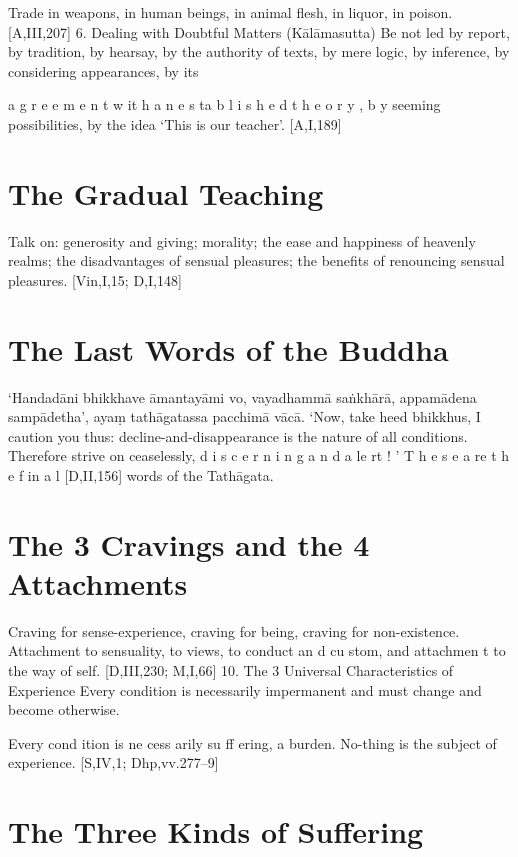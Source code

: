 Trade in weapons, in human beings, in animal
flesh, in liquor, in poison.
[A,III,207]
6. Dealing with Doubtful Matters (Kālāmasutta)
Be not led by report, by tradition, by hearsay,
by the authority of texts, by mere logic, by
inference, by considering appearances, by its

a g r e e m e n t w it h a n e s ta b l i s h e d t h e o r y , b y
seeming possibilities, by the idea ‘This is our
teacher’.
[A,I,189]

\section{The Gradual Teaching}

Talk on: generosity and giving; morality; the
ease and happiness of heavenly realms; the disadvantages of sensual pleasures; the benefits of
renouncing sensual pleasures.
[Vin,I,15; D,I,148]

\section{The Last Words of the Buddha}

‘Handadāni bhikkhave āmantayāmi vo,
vayadhammā saṅkhārā,
appamādena sampādetha’,
ayaṃ tathāgatassa pacchimā vācā.
‘Now, take heed bhikkhus, I caution you thus:
decline-and-disappearance is the nature of all
conditions. Therefore strive on ceaselessly,
d i s c e r n i n g a n d a le rt ! ’ T h e s e a re t h e f in a l
[D,II,156]
words of the Tathāgata.

\section{The 3 Cravings and the 4 Attachments}

Craving for sense-experience, craving for
being, craving for non-existence.
Attachment to sensuality, to views, to conduct
an d cu stom, and attachmen t to the way of
self.
[D,III,230; M,I,66]
10. The 3 Universal Characteristics of Experience
Every condition is necessarily impermanent
and must change and become otherwise.

Every cond ition is ne cess arily su ff ering, a
burden.
No-thing is the subject of experience.
[S,IV,1; Dhp,vv.277–9]

\section{The Three Kinds of Suffering}

